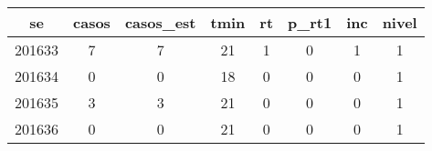 \begin{tabular}{c|ccccccc}
  \hline
se & casos & casos\_est & tmin & rt & p\_rt1 & inc & nivel \\ 
  \hline
201633 & 7 & 7 & 21 & 1 & 0 & 1 & 1 \\ 
  201634 & 0 & 0 & 18 & 0 & 0 & 0 & 1 \\ 
  201635 & 3 & 3 & 21 & 0 & 0 & 0 & 1 \\ 
  201636 & 0 & 0 & 21 & 0 & 0 & 0 & 1 \\ 
   \hline
\end{tabular}
